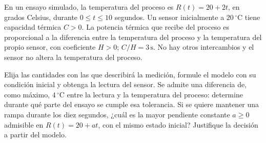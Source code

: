 En un ensayo simulado, la temperatura del proceso es \(R(t)=20+2t\), en grados Celsius, durante \(0\le t\le10\) segundos. Un sensor inicialmente a \(20\,{}^\circ\mathrm C\) tiene capacidad térmica \(C>0\). La potencia térmica que recibe del proceso es proporcional a la diferencia entre la temperatura del proceso y la temperatura del propio sensor, con coeficiente \(H>0\); \(C/H=3\,\mathrm s\). No hay otros intercambios y el sensor no altera la temperatura del proceso.

Elija las cantidades con las que describirá la medición, formule el modelo con su condición inicial y obtenga la lectura del sensor. Se admite una diferencia de, como máximo, \(4\,{}^\circ\mathrm C\) entre la lectura y la temperatura del proceso: determine durante qué parte del ensayo se cumple esa tolerancia. Si se quiere mantener una rampa durante los diez segundos, ¿cuál es la mayor pendiente constante \(a\ge0\) admisible en \(R(t)=20+at\), con el mismo estado inicial? Justifique la decisión a partir del modelo.
